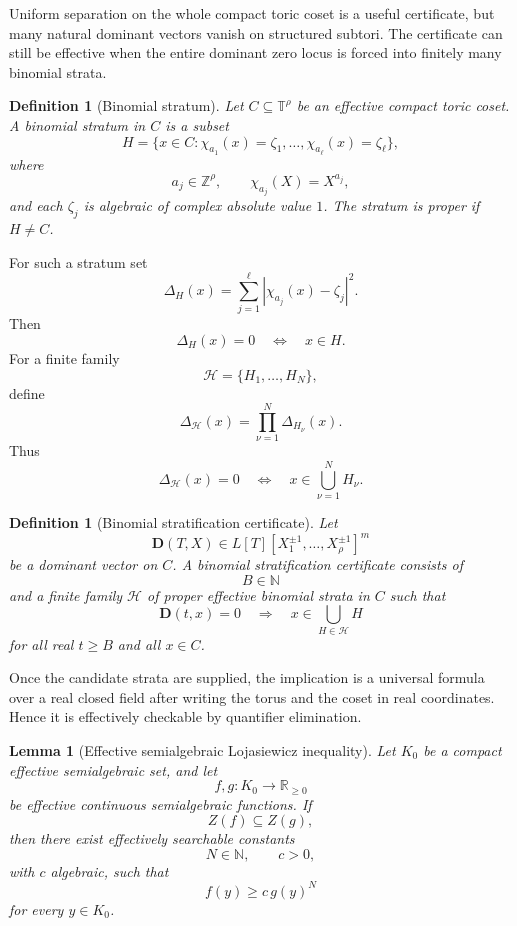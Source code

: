\documentclass[11pt]{article}
\newtheorem{lemma}[theorem]{Lemma}
\newtheorem{definition}[theorem]{Definition}
\newcommand{\T}{\mathbb T}
\newcommand{\Z}{\mathbb Z}
\newcommand{\R}{\mathbb R}
\begin{document}
Uniform separation on the whole compact toric coset is a useful certificate, but many natural dominant vectors vanish on structured subtori. The certificate can still be effective when the entire dominant zero locus is forced into finitely many binomial strata.

\begin{definition}[Binomial stratum]
Let \(C\subseteq\T^\rho\) be an effective compact toric coset. A binomial stratum in \(C\) is a subset
\[
H=
\{x\in C:
\chi_{a_1}(x)=\zeta_1,\ldots,\chi_{a_\ell}(x)=\zeta_\ell\},
\]
where
\[
a_j\in\Z^\rho,
\qquad
\chi_{a_j}(X)=X^{a_j},
\]
and each \(\zeta_j\) is algebraic of complex absolute value \(1\). The stratum is proper if \(H\ne C\).
\end{definition}

For such a stratum set
\[
\Delta_H(x)=
\sum_{j=1}^{\ell}|\chi_{a_j}(x)-\zeta_j|^2.
\]
Then
\[
\Delta_H(x)=0
\quad\Longleftrightarrow\quad
x\in H.
\]
For a finite family
\[
\mathcal H=\{H_1,\ldots,H_N\},
\]
define
\[
\Delta_{\mathcal H}(x)=
\prod_{\nu=1}^N\Delta_{H_\nu}(x).
\]
Thus
\[
\Delta_{\mathcal H}(x)=0
\quad\Longleftrightarrow\quad
x\in \bigcup_{\nu=1}^N H_\nu.
\]

\begin{definition}[Binomial stratification certificate]
Let
\[
\mathbf D(T,X)\in L[T][X_1^{\pm1},\ldots,X_\rho^{\pm1}]^m
\]
be a dominant vector on \(C\). A binomial stratification certificate consists of
\[
B\in\mathbb N
\]
and a finite family \(\mathcal H\) of proper effective binomial strata in \(C\) such that
\[
\mathbf D(t,x)=0
\quad\Longrightarrow\quad
x\in\bigcup_{H\in\mathcal H}H
\]
for all real \(t\ge B\) and all \(x\in C\).
\end{definition}

Once the candidate strata are supplied, the implication is a universal formula over a real closed field after writing the torus and the coset in real coordinates. Hence it is effectively checkable by quantifier elimination.

\begin{lemma}[Effective semialgebraic Lojasiewicz inequality]
Let \(K_0\) be a compact effective semialgebraic set, and let
\[
f,g:K_0\to\R_{\ge0}
\]
be effective continuous semialgebraic functions. If
\[
Z(f)\subseteq Z(g),
\]
then there exist effectively searchable constants
\[
N\in\mathbb N,
\qquad
c>0,
\]
with \(c\) algebraic, such that
\[
f(y)\ge c\,g(y)^N
\]
for every \(y\in K_0\).
\end{lemma}
\end{document}
